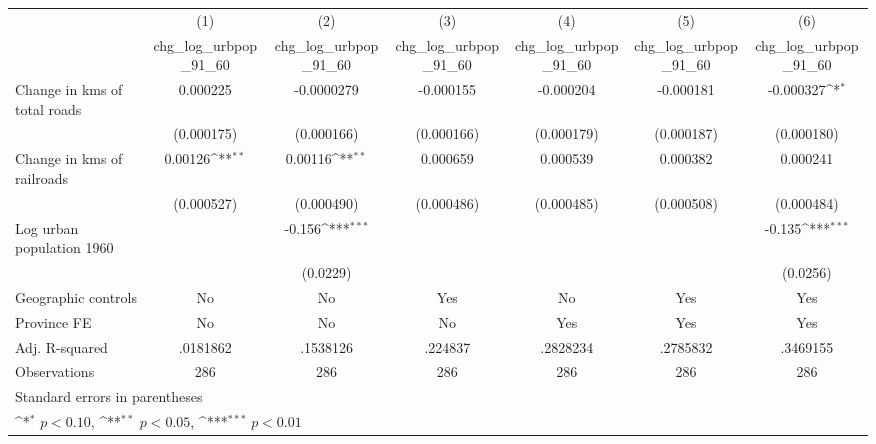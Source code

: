 {
\def\sym#1{\ifmmode^{#1}\else\(^{#1}\)\fi}
\begin{tabular}{l*{6}{c}}
\hline\hline
                    &\multicolumn{1}{c}{(1)}&\multicolumn{1}{c}{(2)}&\multicolumn{1}{c}{(3)}&\multicolumn{1}{c}{(4)}&\multicolumn{1}{c}{(5)}&\multicolumn{1}{c}{(6)}\\
                    &\multicolumn{1}{c}{chg\_log\_urbpop\_91\_60}&\multicolumn{1}{c}{chg\_log\_urbpop\_91\_60}&\multicolumn{1}{c}{chg\_log\_urbpop\_91\_60}&\multicolumn{1}{c}{chg\_log\_urbpop\_91\_60}&\multicolumn{1}{c}{chg\_log\_urbpop\_91\_60}&\multicolumn{1}{c}{chg\_log\_urbpop\_91\_60}\\
\hline
Change in kms of total roads&    0.000225         &  -0.0000279         &   -0.000155         &   -0.000204         &   -0.000181         &   -0.000327\sym{*}  \\
                    &  (0.000175)         &  (0.000166)         &  (0.000166)         &  (0.000179)         &  (0.000187)         &  (0.000180)         \\
[1em]
Change in kms of railroads&     0.00126\sym{**} &     0.00116\sym{**} &    0.000659         &    0.000539         &    0.000382         &    0.000241         \\
                    &  (0.000527)         &  (0.000490)         &  (0.000486)         &  (0.000485)         &  (0.000508)         &  (0.000484)         \\
[1em]
Log urban population 1960&                     &      -0.156\sym{***}&                     &                     &                     &      -0.135\sym{***}\\
                    &                     &    (0.0229)         &                     &                     &                     &    (0.0256)         \\
\hline
Geographic controls &          No         &          No         &         Yes         &          No         &         Yes         &         Yes         \\
Province FE         &          No         &          No         &          No         &         Yes         &         Yes         &         Yes         \\
Adj. R-squared      &    .0181862         &    .1538126         &     .224837         &    .2828234         &    .2785832         &    .3469155         \\
Observations        &         286         &         286         &         286         &         286         &         286         &         286         \\
\hline\hline
\multicolumn{7}{l}{\footnotesize Standard errors in parentheses}\\
\multicolumn{7}{l}{\footnotesize \sym{*} \(p<0.10\), \sym{**} \(p<0.05\), \sym{***} \(p<0.01\)}\\
\end{tabular}
}
